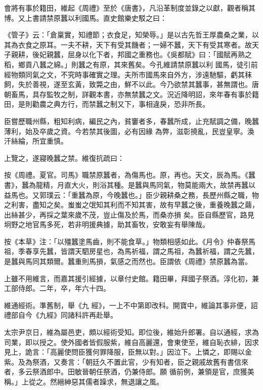 \begin{pinyinscope}
 會將有事於籍田，維起《周禮》至於《唐書》，凡沿革制度並錄之以獻，觀者稱其博。又上書請禁原蠶以利國馬。直史館樂史駁之曰：



 《管子》云：「倉稟實，知禮節；衣食足，知榮辱。」是以古先哲王厚農桑之業，以其為衣食之原耳。一夫不耕，天下有受其饑者；一婦不蠶，天下有受其寒者。故天子親耕，後妃親蠶，屈身以化下者，邦國之重務也。《吳都賦》曰：「國賦再熟之稻，鄉貢八蠶之綿。」則蠶之有原，其來舊矣。今孔維請禁原蠶以利
 國馬，徒引前經物類同氣之文，不究時事確實之理。夫所市國馬來自外方，涉遠馳驅，虧其秣飼，失於善視，遂至玄黃，致斃之由，鮮不以此。今乃欲禁其蠶事，甚無謂也。唐朝畜馬，具存監牧之制，詳觀本書，亦無禁蠶之文。況近降明詔，來年春有事於籍田，是則勸農之典方行，而禁蠶之制又下，事相違戾，恐非所長。



 臣嘗歷職州縣，粗知利病，編民之內，貧窶者多，春蠶所成，止充賦調之備，晚蠶薄利，始及卒歲之資。今若禁其後圖，必有因緣
 為弊，滋彰撓亂，民豈皇寧。渙汗絲綸，所宜重慎。



 上覽之，遂寢晚蠶之禁。維復抗疏曰：



 按《周禮。夏官。司馬》職禁原蠶者，為傷馬也。原，再也。天文，辰為馬。《蠶書》，蠶為龍精，月直大火，則浴其種。是蠶與馬同氣，物莫能兩大，故禁再蠶以益馬也。又郭璞云：「重蠶為原，今晚蠶也。」臣少親耕桑之務，長歷州縣之職，物之利害，盡知之矣。蚩蚩之氓知其利而不知其害，故有早蠶之後，重養晚蠶之繭，出絲甚少，再採之葉來歲不茂，豈止傷及於馬，而桑亦損
 矣。臣自縣歷官，路見坰野之地官馬多死，若非明援典據，助其畜牧，安敢妄有舉陳哉。



 按《本草》注：「以殭蠶塗馬齒，則不能食草。」物類相感如此。《月令》仲春祭馬祖，季春享先蠶，皆謂天駟房星也，為馬祈福，謂之馬祖，為蠶祈福，謂之先蠶，是蠶與馬同其類爾。蠶重則馬損，氣感之而然也。臣謂依《周禮》禁原蠶為當。



 上雖不用維言，而嘉其援引經據，以章付史館。籍田畢，拜國子祭酒。淳化初，兼工部侍郎。二年，卒，年六十四。



 維通經術。準舊制，舉《九
 經》，一上不中第即改科。開寶中，維論其事非便，詔禮部自今《九經》同諸科許再赴舉。



 太宗尹京日，維為屬邑吏，頗以經術受知。即位後，維始升郎署。自以通經，求為司業，即以授之。使外國者皆假服紫，維自高麗還，會東使至，維自恥衣緋，因求見上，詭言：「高麗使問臣獲何罪降服，臣無以對。」因泣下。上憐之，即賜以金紫。及為祭酒，又奏言：「朝廷久不置此官，少有知者，臣之親戚故舊有書信來者，多云祭酒郎中。田敏晉朝任祭酒，仍兼侍郎。願
 循前例，兼領是官，庶獲美稱。」上從之。然縉紳惡其儒者躁求，無退讓之風。




\end{pinyinscope}
